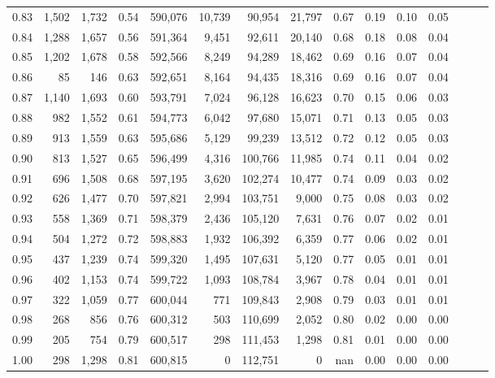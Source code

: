 \begin{tabular}{rrrrrrrrrrrrrrr}
0.83 &   1,502 &  1,732 &  0.54 &  590,076 &   10,739 &   90,954 &   21,797 &  0.67 &  0.19 &  0.10 &      0.05 \\
0.84 &   1,288 &  1,657 &  0.56 &  591,364 &    9,451 &   92,611 &   20,140 &  0.68 &  0.18 &  0.08 &      0.04 \\
0.85 &   1,202 &  1,678 &  0.58 &  592,566 &    8,249 &   94,289 &   18,462 &  0.69 &  0.16 &  0.07 &      0.04 \\
0.86 &      85 &    146 &  0.63 &  592,651 &    8,164 &   94,435 &   18,316 &  0.69 &  0.16 &  0.07 &      0.04 \\
0.87 &   1,140 &  1,693 &  0.60 &  593,791 &    7,024 &   96,128 &   16,623 &  0.70 &  0.15 &  0.06 &      0.03 \\
0.88 &     982 &  1,552 &  0.61 &  594,773 &    6,042 &   97,680 &   15,071 &  0.71 &  0.13 &  0.05 &      0.03 \\
0.89 &     913 &  1,559 &  0.63 &  595,686 &    5,129 &   99,239 &   13,512 &  0.72 &  0.12 &  0.05 &      0.03 \\
0.90 &     813 &  1,527 &  0.65 &  596,499 &    4,316 &  100,766 &   11,985 &  0.74 &  0.11 &  0.04 &      0.02 \\
0.91 &     696 &  1,508 &  0.68 &  597,195 &    3,620 &  102,274 &   10,477 &  0.74 &  0.09 &  0.03 &      0.02 \\
0.92 &     626 &  1,477 &  0.70 &  597,821 &    2,994 &  103,751 &    9,000 &  0.75 &  0.08 &  0.03 &      0.02 \\
0.93 &     558 &  1,369 &  0.71 &  598,379 &    2,436 &  105,120 &    7,631 &  0.76 &  0.07 &  0.02 &      0.01 \\
0.94 &     504 &  1,272 &  0.72 &  598,883 &    1,932 &  106,392 &    6,359 &  0.77 &  0.06 &  0.02 &      0.01 \\
0.95 &     437 &  1,239 &  0.74 &  599,320 &    1,495 &  107,631 &    5,120 &  0.77 &  0.05 &  0.01 &      0.01 \\
0.96 &     402 &  1,153 &  0.74 &  599,722 &    1,093 &  108,784 &    3,967 &  0.78 &  0.04 &  0.01 &      0.01 \\
0.97 &     322 &  1,059 &  0.77 &  600,044 &      771 &  109,843 &    2,908 &  0.79 &  0.03 &  0.01 &      0.01 \\
0.98 &     268 &    856 &  0.76 &  600,312 &      503 &  110,699 &    2,052 &  0.80 &  0.02 &  0.00 &      0.00 \\
0.99 &     205 &    754 &  0.79 &  600,517 &      298 &  111,453 &    1,298 &  0.81 &  0.01 &  0.00 &      0.00 \\
1.00 &     298 &  1,298 &  0.81 &  600,815 &        0 &  112,751 &        0 &   nan &  0.00 &  0.00 &      0.00 \\
\bottomrule
\end{tabular}

